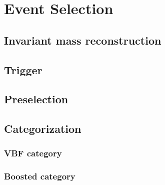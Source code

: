 \chapter{Event Selection}\label{cha:event_selection}

\section{Invariant mass reconstruction}\label{sec:event_selection:mass}

\section{Trigger}\label{sec:event_selection:trigger}

\section{Preselection}\label{sec:event_selection:preselection}

\section{Categorization}\label{sec:event_selection:categorization}

\subsection{VBF category}\label{sub:event_selection:vbf}

\subsection{Boosted category}\label{sub:event_selection:boosted}


